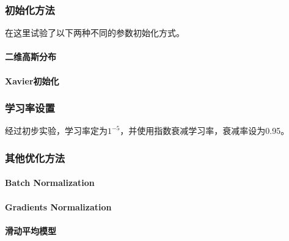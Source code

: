 \subsubsection{初始化方法}
在这里试验了以下两种不同的参数初始化方式。
\paragraph{二维高斯分布}
\paragraph{Xavier初始化}
\subsubsection{学习率设置}
经过初步实验，学习率定为$1^{-5}$，并使用指数衰减学习率，衰减率设为0.95。
\subsubsection{其他优化方法}
\paragraph{Batch Normalization}
\paragraph{Gradients Normalization}
\paragraph{滑动平均模型}
